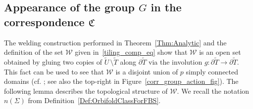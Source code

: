 \documentclass[11pt,a4paper, oneside]{amsart}
\theoremstyle{definition}
\theoremstyle{remark}
\numberwithin{equation}{section}
\def\cW{\mathcal {W}}
\newcommand{\sm}{\setminus}
\renewcommand{\tilde}{\widetilde}
\begin{document}
\subsection{Appearance of the group $G$ in the correspondence $\mathfrak{C}$}\label{group_like_subsec} 

The welding construction performed in Theorem~\ref{Thm:Analytic} and the definition of the set $\pmb{\cW}$ given in~\eqref{tiling_comp_eq} show that $\pmb{\cW}$ is an open set obtained by gluing two copies of $\tilde U\,\sm\tilde T$ along $\partial\tilde T$ via the involution $g \colon \partial\tilde T\to\partial\tilde T$. This fact can be used to see that $\pmb{\cW}$ is a disjoint union of $p$ simply connected domains (cf. \cite[Lemma~5.2, Figure~12]{MM}; see also the top-right in Figure~\ref{corr_group_action_fig}). The following lemma describes the topological structure of $\pmb{\cW}$. 
We recall the notation $n(\Sigma)$ from Definition~\ref{Def:OrbifoldClassForFBS}. 
\end{document}
